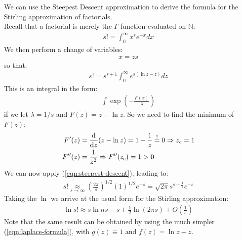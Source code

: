 \documentclass[../template.tex]{subfiles}
\begin{document}
\begin{example}
We can use the Steepest Descent approximation to derive the formula for the Stirling approximation of factorials.\\
Recall that a factorial is merely the $\Gamma$ function evaluated on $\mathbb{N}$:  
\begin{align*}
    s! = \int_0^\infty x^s e^{-x} dx
\end{align*} 
We then perform a change of variables:
\begin{align*}
    x = z s
\end{align*}
so that:
\begin{align*}
    s! = s^{s+1} \int_0^\infty e^{s(\ln z - z)} dz
\end{align*}
This is an integral in the form:
\begin{align*}
    \int \exp\left(-\frac{F(x)}{\lambda} \right)
\end{align*}
if we let $\lambda = 1/s$ and $F(z) = z-\ln z$. So we need to find the minimum of $F(z)$:
\begin{align*}
    F'(z) &= \dv{z}(z-\ln z) = 1-\frac{1}{z} \overset{!}{=}  0 \Rightarrow z_c =  1\\
    F''(z) &= \frac{1}{z^2} \Rightarrow F''(z_c) = 1 > 0 
\end{align*}   
We can now apply (\ref{eqn:steepest-descent}), leading to:
\begin{align*}
    s! \underset{s \to \infty}{\approx}  \left(\frac{2 \pi}{s} \right)^{1/2} (1)^{1/2} e^{-s} = \sqrt{2 \pi} s^{s+\frac{1}{2} } e^{-s}
\end{align*}
Taking the $\ln$ we arrive at the usual form for the Stirling approximation:
\begin{align*}
    \ln s! \approx s \ln ns - s + \frac{1}{2} \ln (2 \pi s) + O\left(\frac{1}{s}\right) 
\end{align*} 
Note that the same result can be obtained by using the much simpler (\ref{eqn:laplace-formula}), with $g(z) \equiv 1$ and $f(z) = \ln z - z$.
\end{example} 
\clearpage
\end{document}
